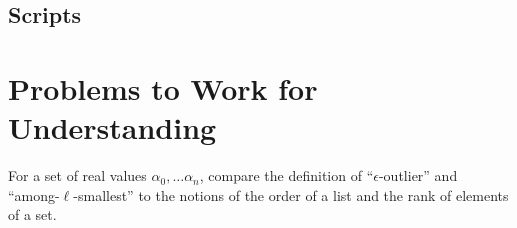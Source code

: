\documentclass[12pt]{article}
\begin{document}
\subsection*{Scripts}



\hr

\section*{Problems to Work for Understanding}
\renewcommand{\theexerciseseries}{}
\renewcommand{\theexercise}{\arabic{exercise}}

\begin{exercise}
    For a set of real values \( \alpha_0, \dots \alpha_n \), compare the
    definition of ``\( \epsilon \)-outlier'' and ``among-\( \ell \)-smallest''
    to the notions of the order of a list and the rank of elements of a
    set.
\end{exercise}
\end{document}
